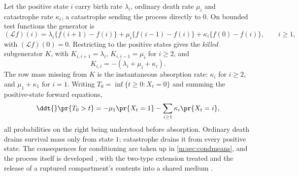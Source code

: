%
Let the positive state $i$ carry
birth rate $\lambda_i$, ordinary death rate $\mu_i$ and catastrophe rate
$\kappa_i$, a catastrophe sending the process directly to $0$. On bounded test
functions the generator is
\begin{equation}
\label{m:eq:bdcgenerator}
(\mathcal Lf)(i)
= \lambda_i\{f(i+1)-f(i)\} + \mu_i\{f(i-1)-f(i)\} + \kappa_i\{f(0)-f(i)\},
\qquad i\ge1,
\end{equation}
with $(\mathcal Lf)(0)=0$. Restricting to the positive states gives the
\emph{killed} subgenerator $K$, with $K_{i,i+1}=\lambda_i$, $K_{i,i-1}=\mu_i$ for
$i\ge2$, and
\begin{equation}
\label{m:eq:killedsubgen}
K_{i,i} = -(\lambda_i+\mu_i+\kappa_i) .
\end{equation}
The row mass missing from $K$ is the instantaneous absorption rate: $\kappa_i$ for
$i\ge2$, and $\mu_1+\kappa_1$ for $i=1$. Writing $T_0=\inf\{t\ge0:X_t=0\}$ and
summing the positive-state forward equations,
\begin{equation}
\label{m:eq:bdcsurvivalloss}
\ddt{}\pr{T_0>t}
= -\mu_1\pr{X_t=1} - \sum_{i\ge1}\kappa_i\pr{X_t=i},
\end{equation}
all probabilities on the right being understood before absorption. Ordinary death
drains survival mass only from state $1$; catastrophe drains it from every positive
state. The
consequences for conditioning are taken up in \cref{m:sec:condmeans}, and the
process itself is developed , with the two-type extension treated
 and the release of a
ruptured compartment's contents into a shared medium
.

